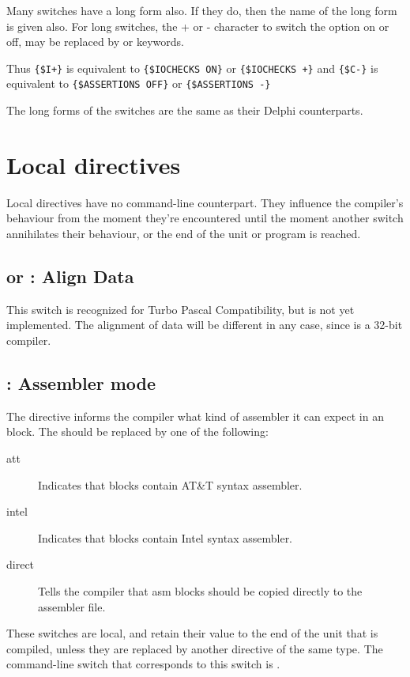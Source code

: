 \documentclass{report}
\begin{document}
Many switches have a long form also. If they do, then the name of the
long form is given also. For long switches, the + or - character to switch
the option on or off, may be replaced by  or  keywords.

Thus \verb|{$I+}| is equivalent to \verb|{$IOCHECKS ON}| or
\verb|{$IOCHECKS +}| and
\verb|{$C-}| is equivalent to \verb|{$ASSERTIONS OFF}| or
\verb|{$ASSERTIONS -}|

The long forms of the switches are the same as their Delphi
counterparts.

\section{Local directives}
\label{se:LocalSwitch}
Local directives have no command-line counterpart. They influence the
compiler's behaviour from the moment they're encountered until the moment
another switch annihilates their behaviour, or the end of the unit or
program is reached.

\subsection{ or : Align Data}

This switch is recognized for Turbo Pascal Compatibility, but is not
yet implemented. The alignment of data will be different in any case, since
\fpc is a 32-bit compiler.

\subsection{ : Assembler mode}
\label{se:AsmReader}

The  directive informs the compiler what kind of assembler
it can expect in an  block. The  should be replaced by one
of the following:
\begin{description}
\item [att\ ] Indicates that  blocks contain AT\&T syntax assembler.
\item [intel\ ] Indicates that  blocks contain Intel syntax
assembler.
\item [direct\ ] Tells the compiler that asm blocks should be copied
directly to the assembler file.
\end{description}
These switches are local, and retain their value to the end of the unit that
is compiled, unless they are replaced by another directive of the same type.
The command-line switch that corresponds to this switch is .
\end{document}
